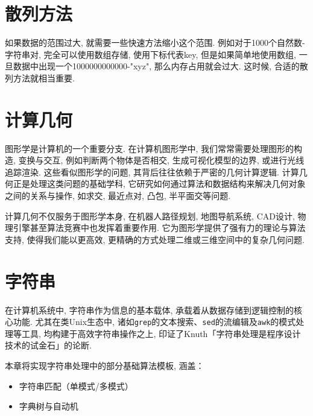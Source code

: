 \documentclass[a4paper]{ctexbook}
\begin{document}


\chapter{散列方法}

如果数据的范围过大, 就需要一些快速方法缩小这个范围. 例如对于1000个自然数-字符串对, 完全可以使用数组存储, 使用下标代表key, 但是如果简单地使用数组, 一旦数据中出现一个1000000000000-"xyz", 那么内存占用就会过大. 这时候, 合适的散列方法就相当重要.



\chapter{计算几何}

图形学是计算机的一个重要分支. 在计算机图形学中, 我们常常需要处理图形的构造, 变换与交互, 例如判断两个物体是否相交, 生成可视化模型的边界, 或进行光线追踪渲染. 这些看似图形学的问题, 其背后往往依赖于严密的几何计算逻辑. 计算几何正是处理这类问题的基础学科, 它研究如何通过算法和数据结构来解决几何对象之间的关系与操作, 如求交, 最近点对, 凸包, 半平面交等问题.

计算几何不仅服务于图形学本身, 在机器人路径规划, 地图导航系统, CAD设计, 物理引擎甚至算法竞赛中也发挥着重要作用. 它为图形学提供了强有力的理论与算法支持, 使得我们能以更高效, 更精确的方式处理二维或三维空间中的复杂几何问题.



\chapter{字符串}

在计算机系统中, 字符串作为信息的基本载体, 承载着从数据存储到逻辑控制的核心功能. 尤其在类Unix生态中, 诸如\texttt{grep}的文本搜索、\texttt{sed}的流编辑及\texttt{awk}的模式处理等工具, 均构建于高效字符串操作之上, 印证了Knuth「字符串处理是程序设计技术的试金石」的论断.

本章将实现字符串处理中的部分基础算法模板, 涵盖：
\begin{itemize}
	\item 字符串匹配（单模式/多模式）
	\item 字典树与自动机
\end{itemize}
\end{document}
